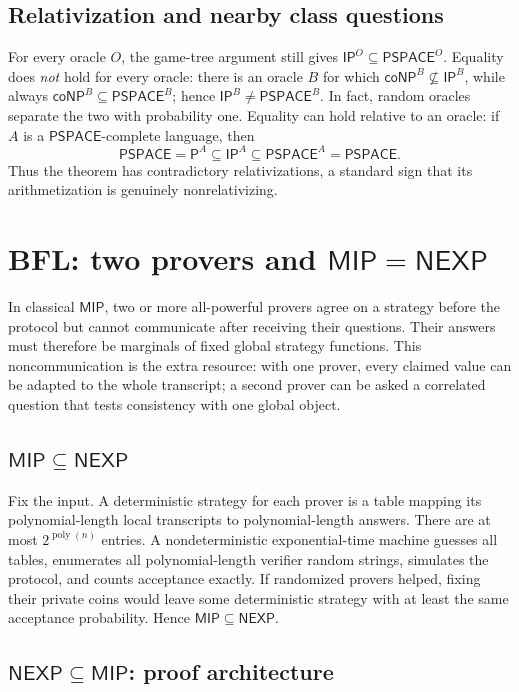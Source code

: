 \documentclass[10pt]{article}
\newcommand{\IP}{\mathsf{IP}}
\newcommand{\MIP}{\mathsf{MIP}}
\newcommand{\PSPACE}{\mathsf{PSPACE}}
\newcommand{\NEXP}{\mathsf{NEXP}}
\newcommand{\coNP}{\mathsf{coNP}}
\begin{document}
\subsection{Relativization and nearby class questions}

For every oracle $O$, the game-tree argument still gives
$\IP^O\subseteq\PSPACE^O$.  Equality does \emph{not} hold for every oracle:
there is an oracle $B$ for which
$\coNP^B\nsubseteq\IP^B$, while always $\coNP^B\subseteq\PSPACE^B$; hence
$\IP^B\neq\PSPACE^B$.  In fact, random oracles separate the two with probability
one.  Equality can hold relative to an oracle: if $A$ is a $\PSPACE$-complete
language, then
\[
 \PSPACE=\mathsf P^A\subseteq\IP^A\subseteq\PSPACE^A=\PSPACE.
\]
Thus the theorem has contradictory relativizations, a standard sign that its
arithmetization is genuinely nonrelativizing.

\section{BFL: two provers and $\MIP=\NEXP$}

In classical $\MIP$, two or more all-powerful provers agree on a strategy before
the protocol but cannot communicate after receiving their questions.  Their
answers must therefore be marginals of fixed global strategy functions.  This
noncommunication is the extra resource: with one prover, every claimed value can
be adapted to the whole transcript; a second prover can be asked a correlated
question that tests consistency with one global object.

\subsection{$\MIP\subseteq\NEXP$}

Fix the input.  A deterministic strategy for each prover is a table mapping its
polynomial-length local transcripts to polynomial-length answers.  There are at
most $2^{\operatorname{poly}(n)}$ entries.  A nondeterministic exponential-time
machine guesses all tables, enumerates all polynomial-length verifier random
strings, simulates the protocol, and counts acceptance exactly.  If randomized
provers helped, fixing their private coins would leave some deterministic strategy
with at least the same acceptance probability.  Hence $\MIP\subseteq\NEXP$.

\subsection{$\NEXP\subseteq\MIP$: proof architecture}
\end{document}
